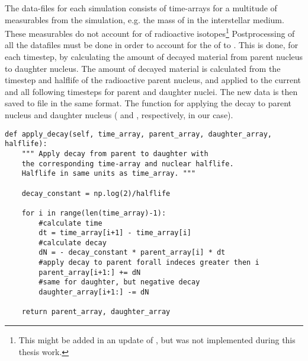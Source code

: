 \label{sec:mod-betadecay}

The data-files for each simulation consists of time-arrays for a multitude of measurables from the simulation, e.g. the mass of  in the interstellar medium.
These measurables do not account for \betadecay of radioactive isotopes\footnote{This might be added in an update of \omegamodel, but was not implemented during this thesis work.}
Postprocessing of all the datafiles must be done in order to account for the \betadecay of  to .
This is done, for each timestep, by calculating the amount of decayed material from parent nucleus to daughter nucleus. The amount of decayed material is calculated from the timestep and halflife of the radioactive parent nucleus, and applied to the current and all following timesteps for parent and daughter nuclei.
The new data is then saved to file in the same format.
The function for applying the decay to parent nucleus and daughter nucleus ( and , respectively, in our case).

\begin{lstlisting}[style=custompython, caption={Snippet of code implementing \betadecay in postprocessing on data calculated by \omegamodel.}]
def apply_decay(self, time_array, parent_array, daughter_array, halflife):
    """ Apply decay from parent to daughter with 
    the corresponding time-array and nuclear halflife.
    Halflife in same units as time_array. """

    decay_constant = np.log(2)/halflife

    for i in range(len(time_array)-1):
        #calculate time
        dt = time_array[i+1] - time_array[i]
        #calculate decay
        dN = - decay_constant * parent_array[i] * dt
        #apply decay to parent forall indeces greater then i
        parent_array[i+1:] += dN
        #same for daughter, but negative decay
        daughter_array[i+1:] -= dN

    return parent_array, daughter_array
\end{lstlisting}
